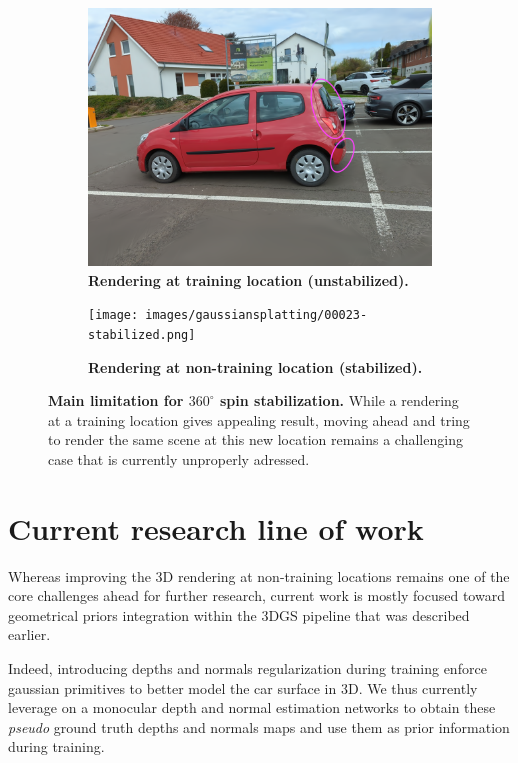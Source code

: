 \begin{figure}[htb!]
  \centering
  \begin{subfigure}[b]{0.45\linewidth}
    \includegraphics[width=\linewidth]{images/gaussiansplatting/00023-unstabilized.png}
    \caption{\textbf{Rendering at training location (unstabilized).}}
  \end{subfigure}
  \quad %
  \begin{subfigure}[b]{0.45\linewidth}
    \texttt{[image: images/gaussiansplatting/00023-stabilized.png]}
    \caption{\textbf{Rendering at non-training location (stabilized).}}
  \end{subfigure}
  \caption{\textbf{Main limitation for $360^{\circ}$ spin stabilization.} While a rendering at a training location gives appealing result, moving ahead and tring to render the same scene at this new location remains a challenging case that is currently unproperly adressed.}
  \label{fig:nontraining-rendering}
\end{figure}

\section{Current research line of work}

Whereas improving the 3D rendering at non-training locations remains one of the core challenges ahead for further research, current work is mostly focused toward geometrical priors integration within the 3D\ac{GS} pipeline that was described earlier. 

Indeed, introducing depths and normals regularization during training enforce gaussian primitives to better model the car surface in 3D. 
We thus currently leverage on a monocular depth \citep{ke2023repurposing,yang2024depth} and normal \citep{bae2024rethinking,ye2024stablenormal} estimation networks to obtain these \textit{pseudo} ground truth depths and normals maps and use them as prior information during training. 

